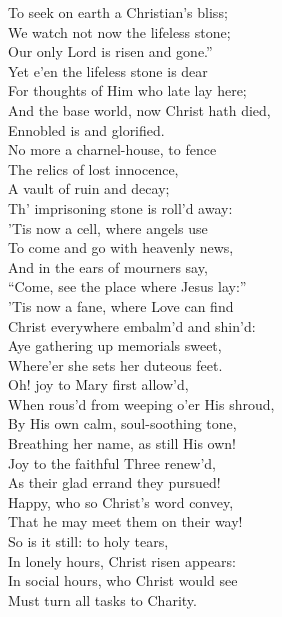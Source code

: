  To seek on earth a Christian’s bliss; \\
 We watch not now the lifeless stone; \\
 Our only Lord is risen and gone.” \\
  Yet e’en the lifeless stone is dear \\
 For thoughts of Him who late lay here; \\
 And the base world, now Christ hath died, \\
 Ennobled is and glorified. \\
  No more a charnel-house, to fence \\
 The relics of lost innocence, \\
 A vault of ruin and decay; \\
 Th’ imprisoning stone is roll’d away: \\
  ’Tis now a cell, where angels use \\
 To come and go with heavenly news, \\
 And in the ears of mourners say, \\
 “Come, see the place where Jesus lay:” \\
  ’Tis now a fane, where Love can find \\
 Christ everywhere embalm’d and shin’d: \\
 Aye gathering up memorials sweet, \\
 Where’er she sets her duteous feet. \\
  Oh! joy to Mary first allow’d, \\
 When rous’d from weeping o’er His shroud, \\
 By His own calm, soul-soothing tone, \\
 Breathing her name, as still His own! \\
  Joy to the faithful Three renew’d, \\
 As their glad errand they pursued! \\
 Happy, who so Christ’s word convey, \\
 That he may meet them on their way! \\
  So is it still: to holy tears, \\
 In lonely hours, Christ risen appears: \\
 In social hours, who Christ would see \\
 Must turn all tasks to Charity.\\


